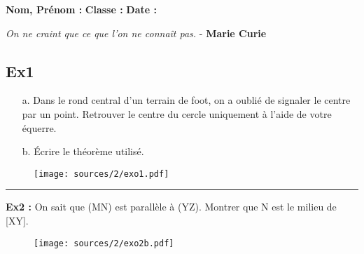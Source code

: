 \documentclass[11pt]{article}
\newcommand{\horrule}[1]{\rule{\linewidth}{#1}} %
\newcommand{\Pointille}[1][3]{\multido{}{#1}{ \makebox[\linewidth]{\dotfill}\\[\parskip]}}
\begin{document}

\textbf{Nom, Prénom :} \hspace{8cm} \textbf{Classe :} \hspace{3cm} \textbf{Date :}

\begin{center}
  \textit{On ne craint que ce que l'on ne connaît pas.}  - \textbf{Marie Curie}
\end{center}



\begin{multicols}{2}

  \subsection*{Ex1}

  \begin{itemize}
  \item[a.] Dans le rond central d'un terrain de foot, on a oublié de signaler le centre par un point. Retrouver le centre du cercle uniquement à l'aide de votre équerre.
  \item[b.] Écrire le théorème utilisé.\newline
    \Pointille[6]
  \end{itemize}

  \begin{figure}[H]
    \centering
    \texttt{[image: sources/2/exo1.pdf]}
  \end{figure}
  
\end{multicols}

\horrule{1px}

\begin{multicols}{2}

\textbf{Ex2 :}  On sait que (MN) est parallèle à (YZ).\newline
  Montrer que N est le milieu de [XY].
  
  \begin{figure}[H]
    \centering
    \texttt{[image: sources/2/exo2b.pdf]}
  \end{figure}

  \Pointille[7]

\end{multicols}
\end{document}
